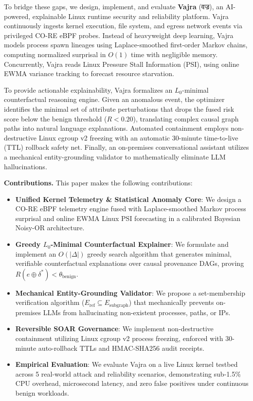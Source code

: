 \documentclass[conference]{IEEEtran}
\begin{document}
To bridge these gaps, we design, implement, and evaluate \textbf{Vajra} (वज्र), an AI-powered, explainable Linux runtime security and reliability platform. Vajra continuously ingests kernel execution, file system, and egress network events via privileged CO-RE eBPF probes. Instead of heavyweight deep learning, Vajra models process spawn lineages using Laplace-smoothed first-order Markov chains, computing normalized surprisal in $O(1)$ time with negligible memory. Concurrently, Vajra reads Linux Pressure Stall Information (PSI), using online EWMA variance tracking to forecast resource starvation.

To provide actionable explainability, Vajra formalizes an $L_0$-minimal counterfactual reasoning engine. Given an anomalous event, the optimizer identifies the minimal set of attribute perturbations that drops the fused risk score below the benign threshold ($R < 0.20$), translating complex causal graph paths into natural language explanations. Automated containment employs non-destructive Linux cgroup v2 freezing with an automatic 30-minute time-to-live (TTL) rollback safety net. Finally, an on-premises conversational assistant utilizes a mechanical entity-grounding validator to mathematically eliminate LLM hallucinations.

\textbf{Contributions.} This paper makes the following contributions:
\begin{itemize}
    \item \textbf{Unified Kernel Telemetry \& Statistical Anomaly Core}: We design a CO-RE eBPF telemetry engine fused with Laplace-smoothed Markov process surprisal and online EWMA Linux PSI forecasting in a calibrated Bayesian Noisy-OR architecture.
    \item \textbf{Greedy $L_0$-Minimal Counterfactual Explainer}: We formulate and implement an $O(|\Delta|)$ greedy search algorithm that generates minimal, verifiable counterfactual explanations over causal provenance DAGs, proving $R(e \oplus \delta^*) < \theta_{\text{benign}}$.
    \item \textbf{Mechanical Entity-Grounding Validator}: We propose a set-membership verification algorithm ($E_{\text{ref}} \subseteq E_{\text{subgraph}}$) that mechanically prevents on-premises LLMs from hallucinating non-existent processes, paths, or IPs.
    \item \textbf{Reversible SOAR Governance}: We implement non-destructive containment utilizing Linux cgroup v2 process freezing, enforced with 30-minute auto-rollback TTLs and HMAC-SHA256 audit receipts.
    \item \textbf{Empirical Evaluation}: We evaluate Vajra on a live Linux kernel testbed across 5 real-world attack and reliability scenarios, demonstrating sub-1.5\% CPU overhead, microsecond latency, and zero false positives under continuous benign workloads.
\end{itemize}
\end{document}

